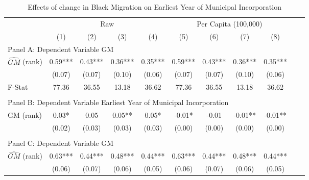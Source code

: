  \begin{table}[htbp]\centering {} \begin{threeparttable} \caption{Effects of change in Black Migration on Earliest Year of Municipal Incorporation} \begin{tabular}{l*{10}{c}} \toprule
                &\multicolumn{4}{c}{Raw}                                    &\multicolumn{4}{c}{Per Capita (100,000)}                   \\\cmidrule(lr){2-5}\cmidrule(lr){6-9}
                &\multicolumn{1}{c}{(1)}   &\multicolumn{1}{c}{(2)}   &\multicolumn{1}{c}{(3)}   &\multicolumn{1}{c}{(4)}   &\multicolumn{1}{c}{(5)}   &\multicolumn{1}{c}{(6)}   &\multicolumn{1}{c}{(7)}   &\multicolumn{1}{c}{(8)}   \\
\cmidrule(lr){1-9}
\multicolumn{8}{l}{Panel A: Dependent Variable GM}\\
\cmidrule(lr){1-9}
$\hat{GM}$ (rank)&       0.59***&       0.43***&       0.36***&       0.35***&       0.59***&       0.43***&       0.36***&       0.35***\\
                &     (0.07)   &     (0.07)   &     (0.10)   &     (0.06)   &     (0.07)   &     (0.07)   &     (0.10)   &     (0.06)   \\
\midrule
F-Stat          &      77.36   &      36.55   &      13.18   &      36.62   &      77.36   &      36.55   &      13.18   &      36.62   \\
\cmidrule[\heavyrulewidth](lr){1-9} \\ \cmidrule[\heavyrulewidth](lr){1-9}
\multicolumn{8}{l}{Panel B: Dependent Variable Earliest Year of Municipal Incorporation}\\
\cmidrule(lr){1-9}
GM  (rank)      &       0.03*  &       0.05   &       0.05** &       0.05*  &      -0.01*  &      -0.01   &      -0.01** &      -0.01** \\
                &     (0.02)   &     (0.03)   &     (0.03)   &     (0.03)   &     (0.00)   &     (0.00)   &     (0.00)   &     (0.00)   \\
\cmidrule[\heavyrulewidth](lr){1-9} \\ \cmidrule[\heavyrulewidth](lr){1-9}
\multicolumn{8}{l}{Panel C: Dependent Variable GM}\\
\cmidrule(lr){1-9}
$\hat{GM}$ (rank)&       0.63***&       0.44***&       0.48***&       0.44***&       0.63***&       0.44***&       0.48***&       0.44***\\
                &     (0.06)   &     (0.07)   &     (0.06)   &     (0.05)   &     (0.06)   &     (0.07)   &     (0.06)   &     (0.05)   \\

\end{tabular}
\end{threeparttable}
\end{table}
